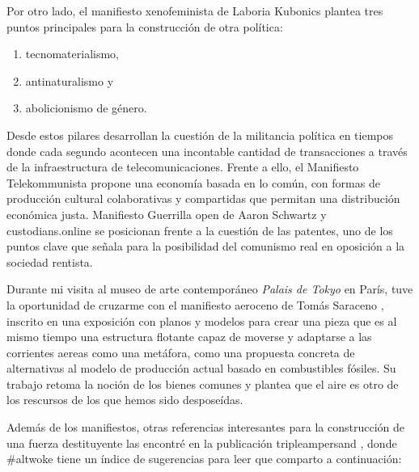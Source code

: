 Por otro lado, el manifiesto xenofeminista de Laboria Kubonics plantea tres puntos principales para la construcción de otra política:

\begin{enumerate}
  \item tecnomaterialismo, 
  \item antinaturalismo y 
  \item abolicionismo de género.
\end{enumerate}

Desde estos pilares desarrollan la cuestión de la militancia política en tiempos donde cada segundo acontecen una incontable cantidad de transacciones a través de la infraestructura de telecomunicaciones. Frente a ello, el Manifiesto Telekommunista propone una economía basada en lo común, con formas de producción cultural colaborativas y compartidas que permitan una distribución económica justa. Manifiesto Guerrilla open de Aaron Schwartz y custodians.online se posicionan frente a la cuestión de las patentes, uno de los puntos clave que señala \autocite{fraseFourFutures2011,fraseFourFuturesVisions2016} para la posibilidad del comunismo real en oposición a la sociedad rentista.

Durante mi visita al museo de arte contemporáneo \emph{Palais de Tokyo} en París, tuve la oportunidad de cruzarme con el manifiesto aeroceno de Tomás Saraceno \autocite{AeroceneManifesto2017}, inscrito en una exposición con planos y modelos para crear una pieza que es al mismo tiempo una estructura flotante capaz de moverse y adaptarse a las corrientes aereas como una metáfora, como una propuesta concreta de alternativas al modelo de producción actual basado en combustibles fósiles. Su trabajo retoma la noción de los bienes comunes y plantea que el aire es otro de los rescursos de los que hemos sido desposeídas.

Además de los manifiestos, otras referencias interesantes para la construcción de una fuerza destituyente las encontré en la publicación tripleampersand \autocite{AltWokeCompanion2017}, donde \#altwoke tiene un índice de sugerencias para leer que comparto a continuación:

